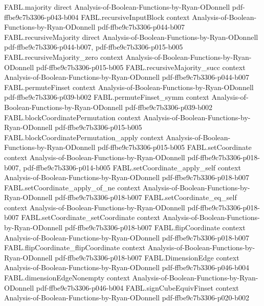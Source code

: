 \begin{theorem}
\proofstep
  {FABL.majority}
  {direct}
  {Analysis-of-Boolean-Functions-by-Ryan-ODonnell}
  {pdf-ffbe9c7b3306-p043-b004}
\proofstep
  {FABL.recursiveInputBlock}
  {context}
  {Analysis-of-Boolean-Functions-by-Ryan-ODonnell}
  {pdf-ffbe9c7b3306-p044-b007}
\proofstep
  {FABL.recursiveMajority}
  {direct}
  {Analysis-of-Boolean-Functions-by-Ryan-ODonnell}
  {pdf-ffbe9c7b3306-p044-b007,
    pdf-ffbe9c7b3306-p015-b005}
\proofstep
  {FABL.recursiveMajority_zero}
  {context}
  {Analysis-of-Boolean-Functions-by-Ryan-ODonnell}
  {pdf-ffbe9c7b3306-p015-b005}
\proofstep
  {FABL.recursiveMajority_succ}
  {context}
  {Analysis-of-Boolean-Functions-by-Ryan-ODonnell}
  {pdf-ffbe9c7b3306-p044-b007}
\proofstep
  {FABL.permuteFinset}
  {context}
  {Analysis-of-Boolean-Functions-by-Ryan-ODonnell}
  {pdf-ffbe9c7b3306-p039-b002}
\proofstep
  {FABL.permuteFinset_symm}
  {context}
  {Analysis-of-Boolean-Functions-by-Ryan-ODonnell}
  {pdf-ffbe9c7b3306-p039-b002}
\proofstep
  {FABL.blockCoordinatePermutation}
  {context}
  {Analysis-of-Boolean-Functions-by-Ryan-ODonnell}
  {pdf-ffbe9c7b3306-p015-b005}
\proofstep
  {FABL.blockCoordinatePermutation_apply}
  {context}
  {Analysis-of-Boolean-Functions-by-Ryan-ODonnell}
  {pdf-ffbe9c7b3306-p015-b005}
\proofstep
  {FABL.setCoordinate}
  {context}
  {Analysis-of-Boolean-Functions-by-Ryan-ODonnell}
  {pdf-ffbe9c7b3306-p018-b007,
    pdf-ffbe9c7b3306-p014-b005}
\proofstep
  {FABL.setCoordinate_apply_self}
  {context}
  {Analysis-of-Boolean-Functions-by-Ryan-ODonnell}
  {pdf-ffbe9c7b3306-p018-b007}
\proofstep
  {FABL.setCoordinate_apply_of_ne}
  {context}
  {Analysis-of-Boolean-Functions-by-Ryan-ODonnell}
  {pdf-ffbe9c7b3306-p018-b007}
\proofstep
  {FABL.setCoordinate_eq_self}
  {context}
  {Analysis-of-Boolean-Functions-by-Ryan-ODonnell}
  {pdf-ffbe9c7b3306-p018-b007}
\proofstep
  {FABL.setCoordinate_setCoordinate}
  {context}
  {Analysis-of-Boolean-Functions-by-Ryan-ODonnell}
  {pdf-ffbe9c7b3306-p018-b007}
\proofstep
  {FABL.flipCoordinate}
  {context}
  {Analysis-of-Boolean-Functions-by-Ryan-ODonnell}
  {pdf-ffbe9c7b3306-p018-b007}
\proofstep
  {FABL.flipCoordinate_flipCoordinate}
  {context}
  {Analysis-of-Boolean-Functions-by-Ryan-ODonnell}
  {pdf-ffbe9c7b3306-p018-b007}
\proofstep
  {FABL.DimensionEdge}
  {context}
  {Analysis-of-Boolean-Functions-by-Ryan-ODonnell}
  {pdf-ffbe9c7b3306-p046-b004}
\proofstep
  {FABL.dimensionEdgeNonempty}
  {context}
  {Analysis-of-Boolean-Functions-by-Ryan-ODonnell}
  {pdf-ffbe9c7b3306-p046-b004}
\proofstep
  {FABL.signCubeEquivFinset}
  {context}
  {Analysis-of-Boolean-Functions-by-Ryan-ODonnell}
  {pdf-ffbe9c7b3306-p020-b002}

\end{theorem}
